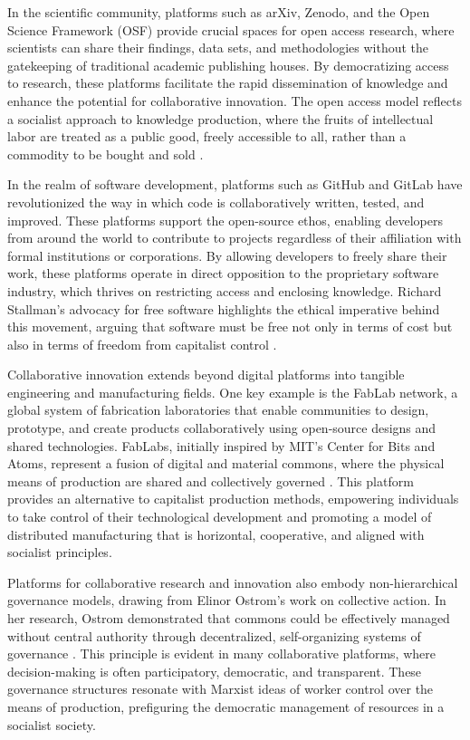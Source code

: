 \begin{refsection}
In the scientific community, platforms such as arXiv, Zenodo, and the Open Science Framework (OSF) provide crucial spaces for open access research, where scientists can share their findings, data sets, and methodologies without the gatekeeping of traditional academic publishing houses. By democratizing access to research, these platforms facilitate the rapid dissemination of knowledge and enhance the potential for collaborative innovation. The open access model reflects a socialist approach to knowledge production, where the fruits of intellectual labor are treated as a public good, freely accessible to all, rather than a commodity to be bought and sold \cite[pp.~147-149]{suber2012}.

In the realm of software development, platforms such as GitHub and GitLab have revolutionized the way in which code is collaboratively written, tested, and improved. These platforms support the open-source ethos, enabling developers from around the world to contribute to projects regardless of their affiliation with formal institutions or corporations. By allowing developers to freely share their work, these platforms operate in direct opposition to the proprietary software industry, which thrives on restricting access and enclosing knowledge. Richard Stallman’s advocacy for free software highlights the ethical imperative behind this movement, arguing that software must be free not only in terms of cost but also in terms of freedom from capitalist control \cite[pp.~78-80]{stallman2010}.

Collaborative innovation extends beyond digital platforms into tangible engineering and manufacturing fields. One key example is the FabLab network, a global system of fabrication laboratories that enable communities to design, prototype, and create products collaboratively using open-source designs and shared technologies. FabLabs, initially inspired by MIT’s Center for Bits and Atoms, represent a fusion of digital and material commons, where the physical means of production are shared and collectively governed \cite[pp.~117-119]{gershenfeld2005}. This platform provides an alternative to capitalist production methods, empowering individuals to take control of their technological development and promoting a model of distributed manufacturing that is horizontal, cooperative, and aligned with socialist principles.

Platforms for collaborative research and innovation also embody non-hierarchical governance models, drawing from Elinor Ostrom’s work on collective action. In her research, Ostrom demonstrated that commons could be effectively managed without central authority through decentralized, self-organizing systems of governance \cite[pp.~79-81]{ostrom1990}. This principle is evident in many collaborative platforms, where decision-making is often participatory, democratic, and transparent. These governance structures resonate with Marxist ideas of worker control over the means of production, prefiguring the democratic management of resources in a socialist society.


\end{refsection}
